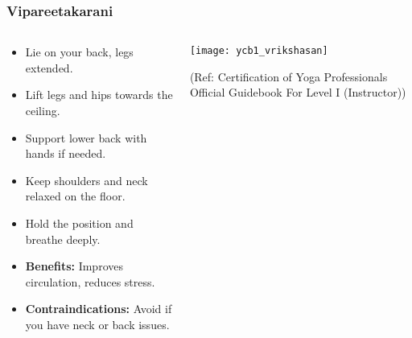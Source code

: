 \begin{frame}[fragile]\frametitle{Vipareetakarani}
\begin{columns}
    \begin{column}[T]{0.5\linewidth}
      \begin{itemize}
        \item Lie on your back, legs extended.
        \item Lift legs and hips towards the ceiling.
        \item Support lower back with hands if needed.
        \item Keep shoulders and neck relaxed on the floor.
        \item Hold the position and breathe deeply.
        \item \textbf{Benefits:} Improves circulation, reduces stress.
        \item \textbf{Contraindications:} Avoid if you have neck or back issues.
      \end{itemize}
    \end{column}
    \begin{column}[T]{0.5\linewidth}
        \begin{center}
        \begin{center}
		        \texttt{[image: ycb1\_vrikshasan]}
				
				{\tiny (Ref: Certification  of Yoga Professionals Official Guidebook For Level I (Instructor))}	        
		\end{center}   
        \end{center}    
    \end{column}
  \end{columns}
\end{frame}

